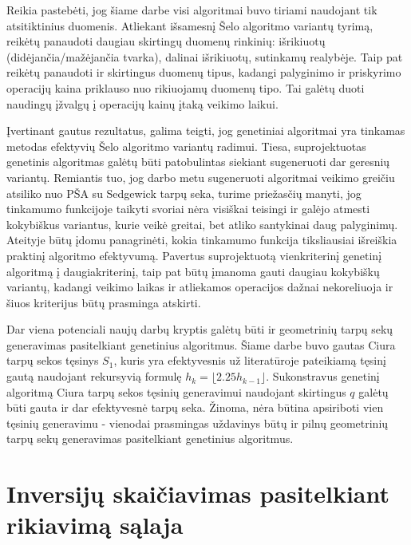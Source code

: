 \documentclass{VUMIFInfKursinis}
\begin{document}
Reikia pastebėti, jog šiame darbe visi algoritmai buvo tiriami naudojant tik atsitiktinius duomenis.
Atliekant išsamesnį Šelo algoritmo variantų tyrimą, reikėtų panaudoti daugiau skirtingų duomenų rinkinių:
išrikiuotų (didėjančia/mažėjančia tvarka), dalinai išrikiuotų, sutinkamų realybėje.
Taip pat reikėtų panaudoti ir skirtingus duomenų tipus, kadangi palyginimo ir priskyrimo operacijų kaina
priklauso nuo rikiuojamų duomenų tipo.
Tai galėtų duoti naudingų įžvalgų į operacijų kainų įtaką veikimo laikui.

Įvertinant gautus rezultatus, galima teigti, jog genetiniai algoritmai yra tinkamas metodas efektyvių Šelo algoritmo variantų radimui.
Tiesa, suprojektuotas genetinis algoritmas galėtų būti patobulintas siekiant sugeneruoti dar geresnių variantų.
Remiantis tuo, jog darbo metu sugeneruoti algoritmai veikimo greičiu atsiliko nuo PŠA su Sedgewick tarpų seka,
turime priežasčių manyti, jog tinkamumo funkcijoje taikyti svoriai nėra visiškai teisingi ir galėjo atmesti kokybiškus variantus, kurie veikė greitai, bet atliko santykinai daug palyginimų.
Ateityje būtų įdomu panagrinėti, kokia tinkamumo funkcija tiksliausiai išreiškia praktinį algoritmo efektyvumą.
Pavertus suprojektuotą vienkriterinį genetinį algoritmą į daugiakriterinį, taip pat būtų įmanoma gauti daugiau kokybiškų variantų,
kadangi veikimo laikas ir atliekamos operacijos dažnai nekoreliuoja ir šiuos kriterijus būtų prasminga atskirti.

Dar viena potenciali naujų darbų kryptis galėtų būti ir geometrinių tarpų sekų generavimas pasitelkiant genetinius algoritmus.
Šiame darbe buvo gautas Ciura tarpų sekos tęsinys $S_1$, kuris yra efektyvesnis už literatūroje pateikiamą tęsinį gautą naudojant rekursyvią formulę $h_{k}=\lfloor 2.25h_{k-1}\rfloor$.
Sukonstravus genetinį algoritmą Ciura tarpų sekos tęsinių generavimui naudojant skirtingus $q$ galėtų būti gauta ir dar efektyvesnė tarpų seka.
Žinoma, nėra būtina apsiriboti vien tęsinių generavimu - vienodai prasmingas uždavinys būtų ir pilnų geometrinių tarpų sekų generavimas pasitelkiant genetinius algoritmus.



\printbibliography[heading=bibintoc] %

\appendix  %

\section{Inversijų skaičiavimas pasitelkiant rikiavimą sąlaja}
\end{document}
